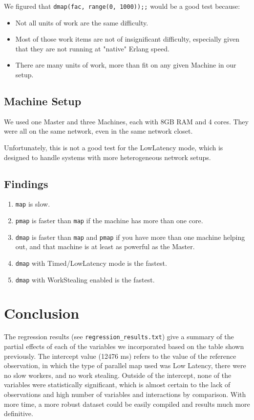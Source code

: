 \documentclass[letterpaper,twocolumn,10pt]{article}
\begin{document}
We figured that \verb|dmap(fac, range(0, 1000));;| would be a good test
because:

\begin{itemize}
    \item Not all units of work are the same difficulty.
    \item Most of those work items are not of insignificant difficulty,
        especially given that they are not running at "native" Erlang speed.
    \item There are many units of work, more than fit on any given Machine in
        our setup.
\end{itemize}

\subsection{Machine Setup}

We used one Master and three Machines, each with 8GB RAM and 4 cores. They were
all on the same network, even in the same network closet.

Unfortunately, this is not a good test for the LowLatency mode, which is
designed to handle systems with more heterogeneous network setups.

\subsection{Findings}

\begin{enumerate}
    \item \verb|map| is slow.
    \item \verb|pmap| is faster than \verb|map| if the machine has more than
        one core.
    \item \verb|dmap| is faster than \verb|map| and \verb|pmap| if you have
        more than one machine helping out, and that machine is at least as
        powerful as the Master.
    \item \verb|dmap| with Timed/LowLatency mode is the fastest.
    \item \verb|dmap| with WorkStealing enabled is the fastest.
\end{enumerate}

\section{Conclusion}

The regression results (see \verb|regression_results.txt|) give a summary of
the partial effects of each of the variables we incorporated based on the table
shown previously. The intercept value (12476 ms) refers to the value of the
reference observation, in which the type of parallel map used was Low Latency,
there were no slow workers, and no work stealing. Outside of the intercept,
none of the variables were statistically significant, which is almost certain
to the lack of observations and high number of variables and interactions by
comparison. With more time, a more robust dataset could be easily compiled and
results much more definitive.
\end{document}
